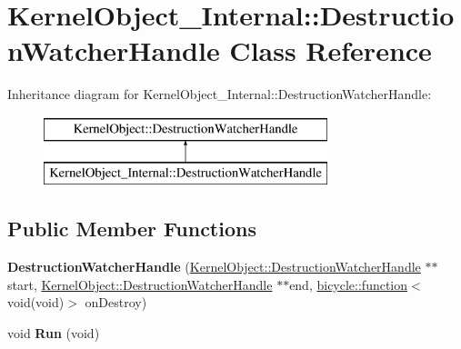 \hypertarget{class_kernel_object___internal_1_1_destruction_watcher_handle}{}\section{Kernel\+Object\+\_\+\+Internal\+:\+:Destruction\+Watcher\+Handle Class Reference}
\label{class_kernel_object___internal_1_1_destruction_watcher_handle}
Inheritance diagram for Kernel\+Object\+\_\+\+Internal\+:\+:Destruction\+Watcher\+Handle\+:\begin{figure}[H]
\begin{center}
\leavevmode
\includegraphics[height=2.000000cm]{class_kernel_object___internal_1_1_destruction_watcher_handle}
\end{center}
\end{figure}
\subsection*{Public Member Functions}
\begin{DoxyCompactItemize}
\item 
\mbox{\label{class_kernel_object___internal_1_1_destruction_watcher_handle_a22c59517d57b899e9c8b8e03ab1323a6}} 
{\bfseries Destruction\+Watcher\+Handle} (\hyperlink{class_kernel_object_1_1_destruction_watcher_handle}{Kernel\+Object\+::\+Destruction\+Watcher\+Handle} $\ast$$\ast$start, \hyperlink{class_kernel_object_1_1_destruction_watcher_handle}{Kernel\+Object\+::\+Destruction\+Watcher\+Handle} $\ast$$\ast$end, \hyperlink{classbicycle_1_1function}{bicycle\+::function}$<$ void(void)$>$ on\+Destroy)
\item 
\mbox{\label{class_kernel_object___internal_1_1_destruction_watcher_handle_ac4a99a8fcb2e0e36a9ed424f1dacf18b}} 
void {\bfseries Run} (void)
\end{DoxyCompactItemize}
